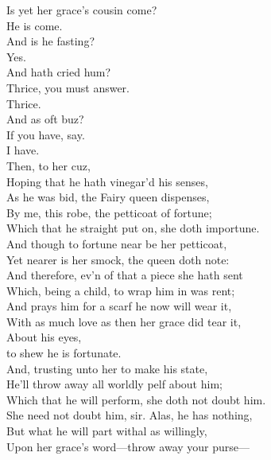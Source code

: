 \documentclass[a4paper,oneside]{memoir}
\begin{document}
\begin{drama*}
\subtlespeaks {} Is yet her grace's cousin come?\\
\facespeaks He is come.\\
\subtlespeaks {} And is he fasting?\\
\facespeaks {} Yes.\\
\subtlespeaks {} And hath cried hum?\\
\facespeaks Thrice, you must answer.\\
\dapperspeaks {} Thrice.\\
\subtlespeaks {} And as oft buz?\\
\facespeaks If you have, say.\\
\dapperspeaks {} I have.\\
\subtlespeaks {} Then, to her cuz,\\
Hoping that he hath vinegar'd his senses,\\
As he was bid, the Fairy queen dispenses,\\
By me, this robe, the petticoat of fortune;\\
Which that he straight put on, she doth importune.\\
And though to fortune near be her petticoat,\\
Yet nearer is her smock, the queen doth note:\\
And therefore, ev'n of that a piece she hath sent\\
Which, being a child, to wrap him in was rent;\\
And prays him for a scarf he now will wear it,\\
With as much love as then her grace did tear it,\\
About his eyes,\\
to shew he is fortunate.\\
And, trusting unto her to make his state,\\
He'll throw away all worldly pelf about him;\\
Which that he will perform, she doth not doubt him.\\
\facespeaks She need not doubt him, sir. Alas, he has nothing,\\
But what he will part withal as willingly,\\
Upon her grace's word---throw away your purse---\\

\end{drama*}
\end{document}
